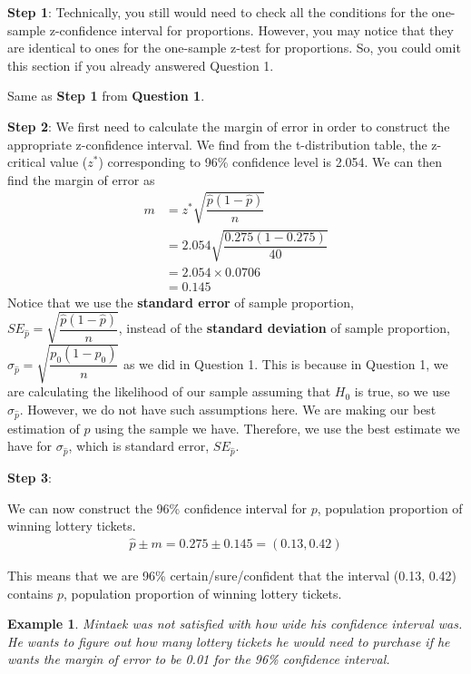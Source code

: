 \documentclass[12pt]{article}
\newcounter{lecnum}
\newtheorem{example}{Example}[lecnum]
\begin{document}
\noindent \textbf{Step 1}: Technically, you still would need to check all the conditions for the one-sample z-confidence interval for proportions. However, you may notice that they are identical to ones for the one-sample z-test for proportions. So, you could omit this section if you already answered Question 1.

Same as \textbf{Step 1} from \textbf{Question 1}.

\noindent \textbf{Step 2}: We first need to calculate the margin of error in order to construct the appropriate z-confidence interval. We find from the t-distribution table, the z-critical value ($z^*$) corresponding to 96\% confidence level is 2.054. We can then find the margin of error as
\begin{align*}
m &= z^* \sqrt{\dfrac{\hat{p} (1 - \hat{p})}{n}} \\
&= 2.054 \sqrt{\dfrac{0.275 (1 - 0.275)}{40}} \\
&= 2.054 \times 0.0706 \\
&= 0.145
\end{align*}
Notice that we use the \textbf{standard error} of sample proportion, $SE_{\hat{p}} = \sqrt{\dfrac{\hat{p} (1 - \hat{p})}{n}}$, instead of the \textbf{standard deviation} of sample proportion, $\sigma_{\hat{p}} = \sqrt{\dfrac{p_0 (1 - p_0)}{n}}$ as we did in Question 1. This is because in Question 1, we are calculating the likelihood of our sample assuming that $H_0$ is true, so we use $\sigma_{\hat{p}}$. However, we do not have such assumptions here. We are making our best estimation of $p$ using the sample we have. Therefore, we use the best estimate we have for $\sigma_{\hat{p}}$, which is standard error, $SE_{\hat{p}}$.

\noindent \textbf{Step 3}:

We can now construct the 96\% confidence interval for $p$, population proportion of winning lottery tickets.
\begin{align*}
\hat{p} \pm m = 0.275 \pm 0.145 = (0.13, 0.42)
\end{align*}

This means that we are 96\% certain/sure/confident that the interval (0.13, 0.42) contains $p$, population proportion of winning lottery tickets.

\pagebreak

\begin{example}
	Mintaek was not satisfied with how wide his confidence interval was. He wants to figure out how many lottery tickets he would need to purchase if he wants the margin of error to be 0.01 for the 96\% confidence interval.
\end{example}
\end{document}
